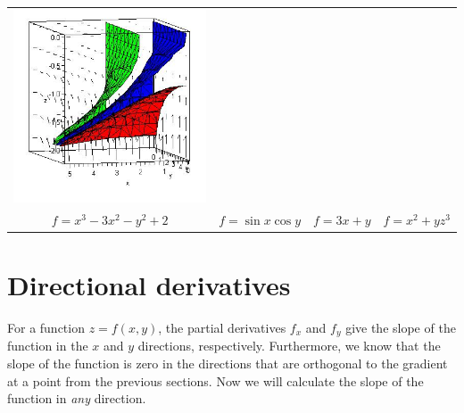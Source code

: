 \begin{center}
\begin{tabular}{cccc}
\includegraphics[width=\mywidth]{08-Optimization/support/levelsurface}\\
$f=x^3-3x^2-y^2+2$&
$f=\sin x\cos y$&
$f=3x+y$&
$f=x^2+yz^3$
\end{tabular}
\end{center}

\section{Directional derivatives}


For a function $z=f(x,y)$, the partial derivatives $f_x$ and $f_y$
give the slope of the function in the $x$ and $y$ directions,
respectively.  Furthermore, we know that the slope of the function is
zero in the directions that are orthogonal to the gradient at a point
from the previous sections.  Now we will calculate the slope of the
function in \emph{any} direction.

